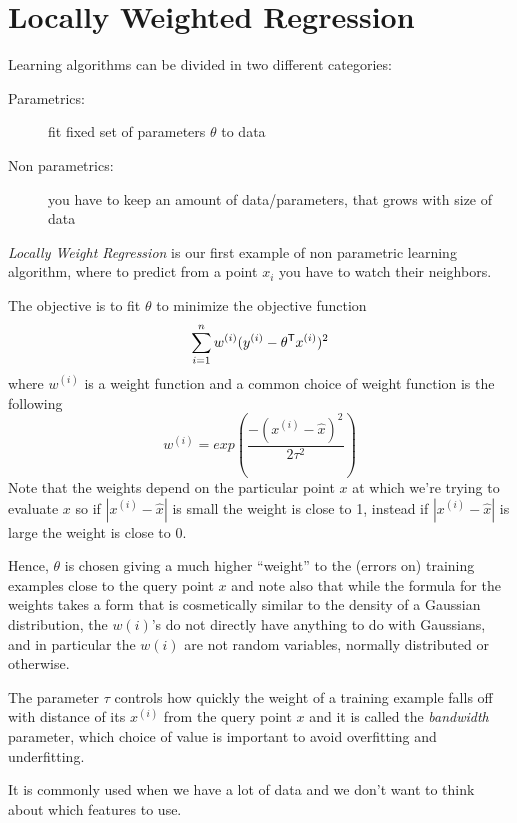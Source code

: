 \section{Locally Weighted Regression}
Learning algorithms can be divided in two different categories:
\begin{description}
    \item [Parametrics:] fit fixed set of parameters $\theta$ to data
    \item [Non parametrics:] you have to keep an amount of data/parameters, that grows with size of data
\end{description}
\emph{Locally Weight Regression} is our first example of non parametric learning algorithm, where to predict
from a point $x_i$ you have to watch their neighbors.

The objective is to fit $\theta$ to minimize the objective function
\[ \sum _{i = 1}^n w^{(i)}(y^{(i)} - \theta ^ \mathsf{T}x^{(i)})^2 \]
where $w^{(i)}$ is a weight function and a common choice of weight function is the following
\[ w^{(i)} = exp \left(\frac{-(x^{(i)} - \hat{x})^2}{2 \tau ^ 2}\right) \]
Note that the weights depend on the particular point $x$ at which we’re trying to evaluate $x$ so
if $|x^{(i)} - \hat{x}|$ is small the weight is close to 1, instead if $|x^{(i)} - \hat{x}|$ is 
large the weight is close to $0$.

Hence, $\theta$ is chosen giving a much higher “weight” to the (errors on) training examples close
to the query point $x$ and note also that while the formula for the weights takes a form that is 
cosmetically similar to the density of a Gaussian distribution, the $w(i)$’s do not directly have anything
to do with Gaussians, and in particular the $w(i)$ are not random variables, normally distributed or otherwise.

The parameter $\tau$ controls how quickly the weight of a training example falls off with distance of
its $x^{(i)}$ from the query point $x$ and it is called the \emph{bandwidth} parameter, which choice of value
is important to avoid overfitting and underfitting.

It is commonly used when we have a lot of data and we don't want to think about which features to use.


